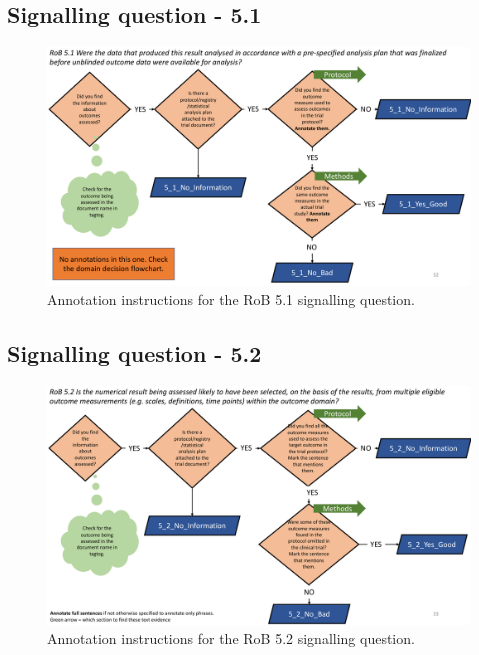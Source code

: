 \documentclass[sn-mathphys,Numbered]{sn-jnl}%
\begin{document}
\subsection*{Signalling question - 5.1 }
%
\begin{figure}[htbp]
    \centering
    \includegraphics[width=\textwidth]{figures/5_1.pdf}
    \caption{Annotation instructions for the RoB 5.1 signalling question.}
    \label{fig:5_1}
\end{figure}
%
%
%
\subsection*{Signalling question - 5.2 }
%
\begin{figure}[htbp]
    \centering
    \includegraphics[width=\textwidth]{figures/5_2.pdf}
    \caption{Annotation instructions for the RoB 5.2 signalling question.}
    \label{fig:5_2}
\end{figure}
%
%
%
\end{document}
